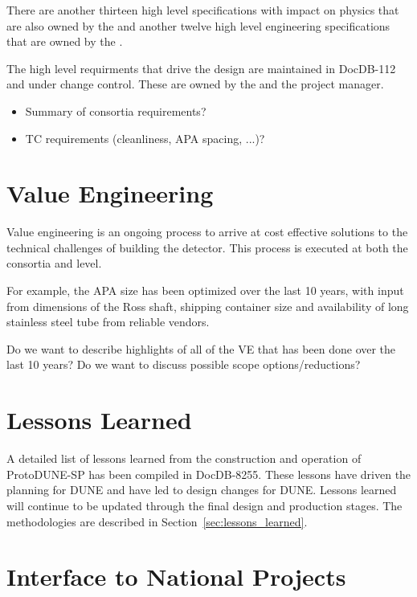 There are another thirteen high level specifications with impact on
physics that are also owned by the  and another twelve high
level engineering specifications that are owned by the .

The high level  requirments that drive the  design are
maintained in DocDB-112 and under change control. These are owned by
the   and the  project manager.

\begin{itemize}
 \item Summary of consortia requirements?
 \item TC requirements (cleanliness, APA spacing, ...)?
\end{itemize}


\section{Value Engineering}
\label{sec:fdsp-coord-ve}

Value engineering is an ongoing process to arrive at cost effective
solutions to the technical challenges of building the 
detector.  This process is executed at both the consortia and
 level.

For example, the APA size has been optimized over the last 10 years,
with input from dimensions of the Ross shaft, shipping container size
and availability of long stainless steel tube from reliable vendors.

Do we want to describe highlights of all of the VE that has been done
over the last 10 years? Do we want to discuss possible scope options/reductions?

\section{Lessons Learned}
\label{sec:fdsp-coord-lessons}

A detailed list of lessons learned from the construction and operation
of ProtoDUNE-SP has been compiled in DocDB-8255. These lessons have
driven the planning for DUNE and have led to design changes for
DUNE. Lessons learned will continue to be updated through the final
design and production stages. The methodologies are described in
Section~\ref{sec:lessons_learned}.

\section{Interface to National Projects}
\label{sec:fdsp-coord-national}

